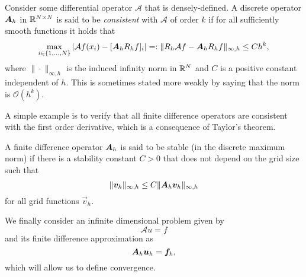 \begin{definition}[Consistency]
    Consider some differential operator $\mathcal A$ that is densely-defined. A discrete operator $\mat A_h$ in $\mathbb{R}^{N\times N}$ is said to be \emph{consistent} with $\mathcal A$ of order $k$ if for all sufficiently smooth functions it holds that
    \begin{equation}\label{def:consistency}
        \max_{i\in\{1,\hdots,N\}}|\mathcal Af(x_i) - [\mat A_h R_h f]_i| =: \|R_h \mathcal Af - \mat A_hR_h f\|_{\infty,h} \leq C h^k,
    \end{equation}
    where $\|\cdot \|_{\infty,h}$ is the induced infinity norm in $\mathbb{R}^N$ and $C$ is a positive constant independent of $h$. This is sometimes stated more weakly by saying that the norm is $\mathcal O(h^k)$. 
\end{definition}

A simple example is to verify that all finite difference operators are consistent with the first order derivative, which is a consequence of Taylor's theorem.
\begin{definition}[Stability]
    A finite difference operator $\mat A_h$ is said to be stable (in the discrete maximum norm) if there is a stability constant $C>0$ that does not depend on the grid size such that
    \begin{equation}\label{def:stability}
        \| \vec v_h \|_{\infty,h} \leq C \|\mat A_h \vec v_h \|_{\infty,h}
    \end{equation}
    for all grid functions $\vec v_h$. 
\end{definition}
We finally consider an infinite dimensional problem given by
\begin{equation}
    \mathcal A u = f
\end{equation}
and its finite difference approximation as
\begin{equation}\label{def:fd-approx}
    \mat A_h \vec u_h = \vec f_h,
\end{equation}
which will allow us to define convergence. 

